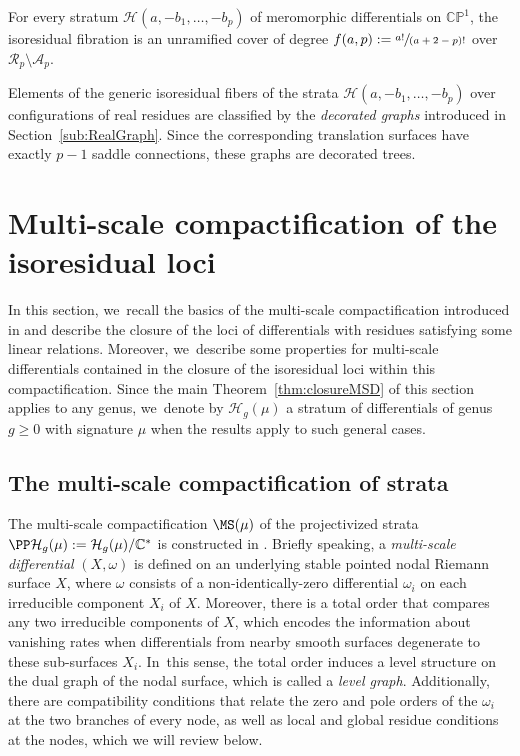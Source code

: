 \begin{thm}\label{thm:numerofibre}
For every stratum $\mathcal{H}(a,-b_{1},\dots,-b_{p})$ of meromorphic differentials on $\mathbb{CP}^{1}$, the isoresidual fibration is an unramified cover of degree $f(a,p):=\sfrac{a!}{(a+2-p)!}$ over $\mathcal{R}_{p} \setminus \mathcal{A}_{p}$.
\end{thm}

Elements of the generic isoresidual fibers of the strata $\mathcal{H}(a,-b_{1},\dots,-b_{p})$ over configurations of real residues are classified by the \textit{decorated graphs} introduced in Section~\ref{sub:RealGraph}. Since the corresponding translation surfaces have exactly $p-1$ saddle connections, these graphs are decorated trees.\enlargethispage{\baselineskip}

\section{Multi-scale compactification of the isoresidual loci}\label{sec:multi-scale}

In this section, we~recall the basics of the multi-scale compactification introduced in \cite{BCGGM3} and describe the closure of the loci of differentials with residues satisfying some linear relations. Moreover, we~describe some properties for multi-scale differentials contained in the closure of the isoresidual loci within this compactification. Since the main Theorem~\ref{thm:closureMSD} of this section applies to any genus, we~denote by $\mathcal H_{g}(\mu)$ a stratum of differentials of genus $g\geq0$ with signature $\mu$ when the results apply to such general cases.

\subsection{The multi-scale compactification of strata}\label{sub:multi-scale}

The multi-scale compactification $\MS(\mu)$ of the projectivized strata $\PP\mathcal H_{g}(\mu):= \mathcal H_{g}(\mu) / \mathbb C^*$ is constructed in \cite{BCGGM2}. Briefly speaking, a {\em multi-scale differential} $(X,\omega)$ is defined on an underlying stable pointed nodal Riemann surface $X$, where $\omega$ consists of a non-identically-zero differential $\omega_{i}$ on each irreducible component $X_{i}$ of $X$. Moreover, there is a total order that compares any two irreducible components of $X$, which encodes the information about vanishing rates when differentials from nearby smooth surfaces degenerate to these sub-surfaces $X_i$. In~this sense, the total order induces a level structure on the dual graph of the nodal surface, which is called a {\em level graph}. Additionally, there are compatibility conditions that relate the zero and pole orders of the $\omega_{i}$ at the two branches of every node, as well as local and global residue conditions at the nodes, which we will review below.


